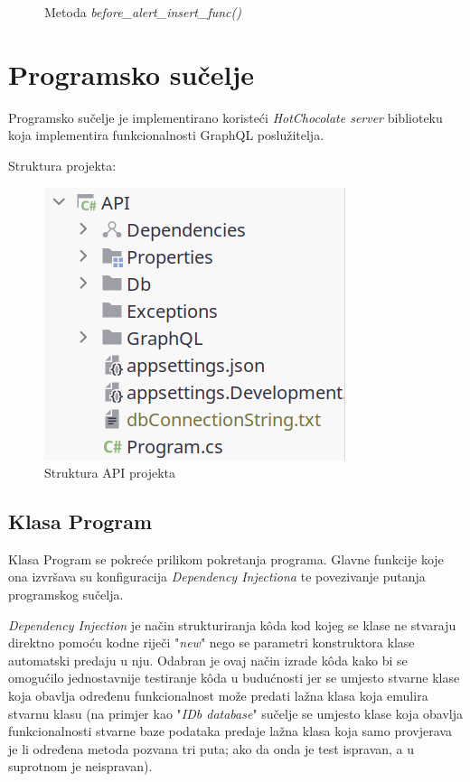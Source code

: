 \documentclass[zavrsnirad]{fer}
\begin{document}
\begin{figure}[htb]
	\centering
	
	\caption{Metoda \textit{before\_alert\_insert\_func()}}
\end{figure}
\FloatBarrier

\chapter{Programsko sučelje}
Programsko sučelje je implementirano koristeći \textit{HotChocolate server} biblioteku koja implementira funkcionalnosti GraphQL poslužitelja.

Struktura projekta:
\begin{figure}[htb]
	\centering
	\includegraphics[width=0.4\linewidth]{images/api_structure.png} 
	\caption{Struktura API projekta}
	\label{slk:api_structure}
\end{figure}
\FloatBarrier

\section{Klasa Program}
Klasa Program se pokreće prilikom pokretanja programa. Glavne funkcije koje ona izvršava su konfiguracija \textit{Dependency Injectiona} te povezivanje putanja programskog sučelja.

\textit{Dependency Injection} je način strukturiranja kôda kod kojeg se klase ne stvaraju direktno pomoću kodne riječi "\textit{new}" nego se parametri konstruktora klase automatski predaju u nju. Odabran je ovaj način izrade kôda kako bi se omogućilo jednostavnije testiranje kôda u budućnosti jer se umjesto stvarne klase koja obavlja određenu funkcionalnost može predati lažna klasa koja emulira stvarnu klasu (na primjer kao "\textit{IDb database}" sučelje se umjesto klase koja obavlja funkcionalnosti stvarne baze podataka predaje lažna klasa koja samo provjerava je li određena metoda pozvana tri puta; ako da onda je test ispravan, a u suprotnom je neispravan).
\end{document}
